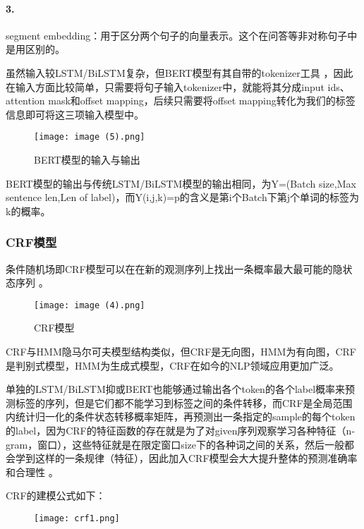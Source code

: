 \documentclass{article}
\begin{document}
\paragraph{3.} segment embedding：用于区分两个句子的向量表示。这个在问答等非对称句子中是用区别的。

虽然输入较LSTM/BiLSTM复杂，但BERT模型有其自带的tokenizer工具\cite{devlin2018bert} ，因此在输入方面比较简单，只需要将句子输入tokenizer中，就能将其分成input ids、attention mask和offset mapping，后续只需要将offset mapping转化为我们的标签信息即可将这三项输入模型中。

\begin{figure}[H]
	\centering
    \texttt{[image: image (5).png]}
    \caption{BERT模型的输入与输出}
    \label{fig:BERT的输入与输出}
\end{figure}

BERT模型的输出与传统LSTM/BiLSTM模型的输出相同，为Y=(Batch size,Max sentence len,Len of label)，而Y(i,j,k)=p的含义是第i个Batch下第j个单词的标签为k的概率。

\subsubsection{CRF模型}
条件随机场即CRF模型可以在在新的观测序列上找出一条概率最大最可能的隐状态序列\cite{huang2015bidirectional} 。

\begin{figure}[H]
	\centering
    \texttt{[image: image (4).png]}
    \caption{CRF模型}
    \label{fig:CRF模型}
\end{figure}

CRF与HMM隐马尔可夫模型结构类似，但CRF是无向图，HMM为有向图，CRF是判别式模型，HMM为生成式模型，CRF在如今的NLP领域应用更加广泛。

单独的LSTM/BiLSTM抑或BERT也能够通过输出各个token的各个label概率来预测标签的序列，但是它们都不能学习到标签之间的条件转移，而CRF是全局范围内统计归一化的条件状态转移概率矩阵，再预测出一条指定的sample的每个token的label，因为CRF的特征函数的存在就是为了对given序列观察学习各种特征（n-gram，窗口），这些特征就是在限定窗口size下的各种词之间的关系，然后一般都会学到这样的一条规律（特征），因此加入CRF模型会大大提升整体的预测准确率和合理性\cite{huang2015bidirectional} 。

CRF的建模公式如下：

\begin{figure}[H]
	\centering
    \texttt{[image: crf1.png]}
    \label{fig:CRF1}
\end{figure}
\end{document}
